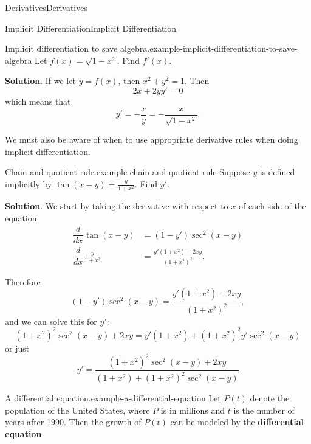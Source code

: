 \documentclass[10pt,]{book}
\newcommand{\terminology}[1]{\textbf{#1}}
\numberwithin{equation}{section}
\newcommand{\dv}[3][]{\dfrac{d^{#1} #2}{d #3^{#1}}}
\begin{document}
\begin{chapterptx}{Derivatives}{}{Derivatives}{}{}
\begin{sectionptx}{Implicit Differentiation}{}{Implicit Differentiation}{}{}
\begin{example}{Implicit differentiation to save algebra.}{example-implicit-differentiation-to-save-algebra}%
\hypertarget{p-161}{}%
Let \(f(x) = \sqrt{1-x^{2}}\). Find \(f'(x)\).%
\par\smallskip%
\noindent\textbf{Solution}.\hypertarget{solution-34}{}\quad%
\hypertarget{p-162}{}%
If we let \(y=f(x)\), then \(x^{2} + y^{2} = 1\). Then%
\begin{equation*}
2x + 2yy' = 0
\end{equation*}
which means that%
\begin{equation*}
y' = -\frac{x}{y} = -\frac{x}{\sqrt{1-x^{2}}}.
\end{equation*}
%
\end{example}
\hypertarget{p-163}{}%
We must also be aware of when to use appropriate derivative rules when doing implicit differentiation.%
\begin{example}{Chain and quotient rule.}{example-chain-and-quotient-rule}%
\hypertarget{p-164}{}%
Suppose \(y\) is defined implicitly by \(\tan(x-y) = \frac{y}{1+x^{2}}\). Find \(y'\).%
\par\smallskip%
\noindent\textbf{Solution}.\hypertarget{solution-35}{}\quad%
\hypertarget{p-165}{}%
We start by taking the derivative with respect to \(x\) of each side of the equation:%
\begin{align*}
\dv{}{x}\tan(x-y) & = (1-y')\sec^{2}(x-y) \\
\dv{}{x}\frac{y}{1+x^{2}} & = \frac{y'(1+x^{2}) - 2xy}{(1+x^{2})^{2}}. 
\end{align*}
%
\par
\hypertarget{p-166}{}%
Therefore%
\begin{equation*}
(1-y')\sec^{2}(x-y) = \frac{y'(1+x^{2}) - 2xy}{(1+x^{2})^{2}},
\end{equation*}
and we can solve this for \(y'\):%
\begin{equation*}
(1+x^{2})^{2}\sec^{2}(x-y) + 2xy = y'(1+x^{2}) + (1+x^{2})^{2}y'\sec^{2}(x-y)
\end{equation*}
or just%
\begin{equation*}
y' = \frac{(1+x^{2})^{2}\sec^{2}(x-y) + 2xy}{(1+x^{2})+(1+x^{2})^{2}\sec^{2}(x-y)}
\end{equation*}
%
\end{example}
\begin{example}{A differential equation.}{example-a-differential-equation}%
\hypertarget{p-167}{}%
Let \(P(t)\) denote the population of the United States, where \(P\) is in millions and \(t\) is the number of years after 1990. Then the growth of \(P(t)\) can be modeled by the \terminology{differential equation}%

\end{example}
\end{sectionptx}
\end{chapterptx}
\end{document}
